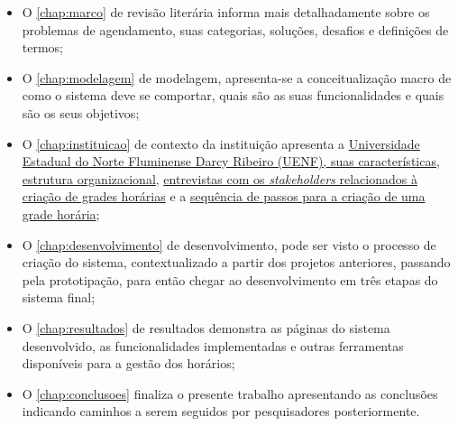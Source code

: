 \begin{itemize}
  \item O \autoref{chap:marco} de revisão literária informa mais detalhadamente sobre os problemas de agendamento, suas categorias, soluções, desafios e definições de termos;
  \item O \autoref{chap:modelagem} de modelagem, apresenta-se a conceitualização macro de como o sistema deve se comportar, quais são as suas funcionalidades e quais são os seus objetivos;
  \item O \autoref{chap:instituicao} de contexto da instituição apresenta a \hyperref[sec:estatuto]{Universidade Estadual do Norte Fluminense Darcy Ribeiro (UENF), suas características, estrutura organizacional}, \hyperref[sec:entrevistas]{entrevistas com os \textit{stakeholders} relacionados à criação de grades horárias} e a \hyperref[sec:sequencia]{sequência de passos para a criação de uma grade horária};
  \item O \autoref{chap:desenvolvimento} de desenvolvimento, pode ser visto o processo de criação do sistema, contextualizado a partir dos projetos anteriores, passando pela prototipação, para então chegar ao desenvolvimento em três etapas do sistema final;
  \item O \autoref{chap:resultados} de resultados demonstra as páginas do sistema desenvolvido, as funcionalidades implementadas e outras ferramentas disponíveis para a gestão dos horários;
  \item O \autoref{chap:conclusoes} finaliza o presente trabalho apresentando as conclusões indicando caminhos a serem seguidos por pesquisadores posteriormente.
\end{itemize}

